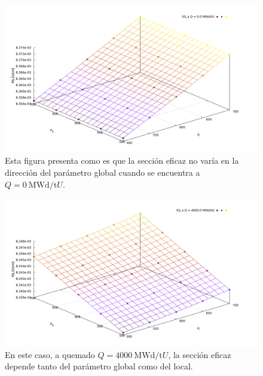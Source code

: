 \documentclass[11pt]{article}
\begin{document}
\begin{figure}[!h]
 \begin{center}
  \includegraphics[width=1\linewidth]{graficos/dependencias-xs/XS1.pdf}
 \end{center}
\caption{\label{fig:global-local-pth-1} Esta figura presenta como es que la sección eficaz no varía en la dirección del parámetro global cuando se encuentra a $Q = \SI{0}{\mega\watt\day\per\tonne U}$.}
\end{figure}

\begin{figure}[!h]
 \begin{center}
  \includegraphics[width=1\linewidth]{graficos/dependencias-xs/XS2.pdf}
 \end{center}
\caption{\label{fig:global-local-pth-2} En este caso, a quemado $Q = \SI{4000}{\mega\watt\day\per\tonne U}$, la sección eficaz depende tanto del parámetro global como del local.}
\end{figure}
\end{document}
